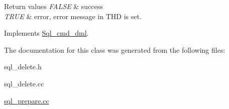 \begin{DoxyRetVals}{Return values}
{\em F\+A\+L\+SE} & success \\
\hline
{\em T\+R\+UE} & error, error message in T\+HD is set. \\
\hline
\end{DoxyRetVals}


Implements \mbox{\hyperlink{classSql__cmd__dml_af36dc69e855d0e48d0e79002576907a4}{Sql\+\_\+cmd\+\_\+dml}}.



The documentation for this class was generated from the following files\+:\begin{DoxyCompactItemize}
\item 
sql\+\_\+delete.\+h\item 
sql\+\_\+delete.\+cc\item 
\mbox{\hyperlink{sql__prepare_8cc}{sql\+\_\+prepare.\+cc}}\end{DoxyCompactItemize}

